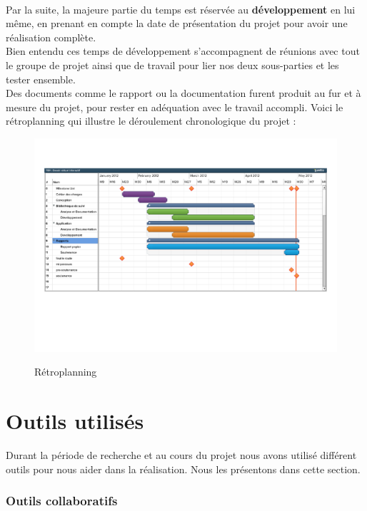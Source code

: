 \documentclass{report}
\begin{document}
			\paragraph{}
			Par la suite, la majeure partie du temps est réservée au \textbf{développement} en lui même, en prenant en compte la date de présentation du projet pour avoir une réalisation complète. \\  
			Bien entendu ces temps de développement s'accompagnent de réunions avec tout le groupe de projet ainsi que de travail pour lier nos deux sous-parties et les tester ensemble. \\
			Des documents comme le rapport ou la documentation furent produit au fur et à mesure du projet, pour rester en adéquation avec le travail accompli. Voici le rétroplanning qui illustre le déroulement chronologique du projet : \\
				\begin{figure}[!h]
					\centering
					\includegraphics[scale=0.6]{../images/retro-planning.pdf}\\
					\caption{Rétroplanning}
					\label{Rétroplanning}
				\end{figure}
		\newpage
		\section{Outils utilisés}
		Durant la période de recherche et au cours du projet nous avons utilisé différent outils pour nous aider dans la réalisation. Nous les présentons dans cette section. 
			\subsubsection{Outils collaboratifs}
\end{document}
